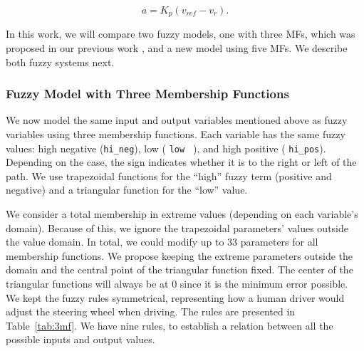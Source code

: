 \documentclass[symmetry,article,submit,moreauthors,pdftex]{Definitions/mdpi}
\begin{document}
\begin{equation}
    a = K_p(v_{ref}-v_r).
\end{equation}

In this work, we will compare two fuzzy models, one with three MFs, which was
proposed in our previous work \cite{Mancilla2021}, and a new model using five
MFs. We describe both fuzzy systems next.

\subsubsection{Fuzzy Model with Three Membership Functions}

We now model the same input and output variables mentioned above as fuzzy
variables using three membership functions. Each variable has the same fuzzy
values: high negative ({\tt hi\_neg}), low ({ \tt  low } ), and high positive
({ \tt hi\_pos}). Depending on the case, the sign indicates whether it is to
the right or left of the path. We use trapezoidal functions for the ``high''
fuzzy term (positive and negative) and a triangular function for the ``low''
value.

We consider a total membership in extreme values (depending on each variable's
domain). Because of this, we ignore the trapezoidal parameters' values outside
the value domain. In total, we could modify up to 33 parameters for all
membership functions. We propose keeping the extreme parameters outside the
domain and the central point of the triangular function fixed. The center of
the triangular functions will always be at 0 since it is the minimum error
possible.  We kept the fuzzy rules symmetrical, representing how a human driver
would adjust the steering wheel when driving. The rules are presented in Table~\ref{tab:3mf}.
We have nine rules, to establish a relation between all the
possible inputs and output values.
\end{document}
